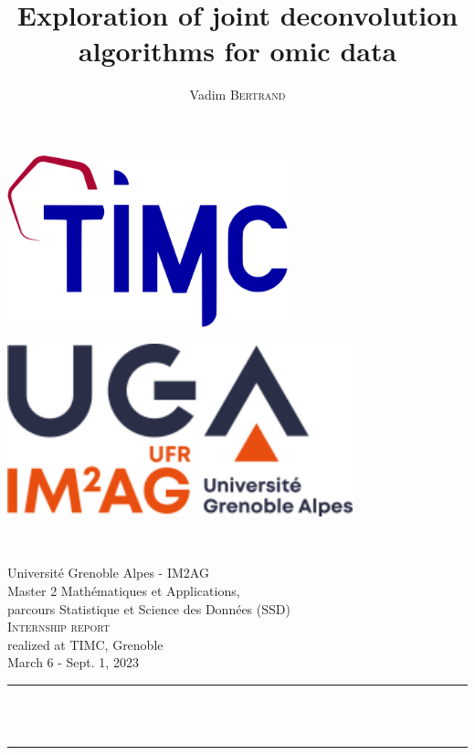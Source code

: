 \documentclass{article}
\title{Exploration of joint deconvolution algorithms for omic data}
\author{Vadim \textsc{Bertrand}}
\date{}
\makeatletter
\let\thetitle\@title
\makeatother
\begin{document}
\begin{titlepage}
    \noindent
	\begin{minipage}{0.5\textwidth}
        \includegraphics[width=0.61\textwidth,left]{logo/logo_timc}
	\end{minipage}
	\begin{minipage}{0.5\textwidth}
        \includegraphics[width=0.75\textwidth,right]{logo/logo_im2ag}
	\end{minipage}\\[1.5 cm]

    \begin{center}
        {\Large Université Grenoble Alpes - IM2AG\\[.5 cm]
        Master 2 Mathématiques et Applications,\\
        parcours Statistique et Science des Données (SSD)}\\[1.5 cm]

        \textsc{\LARGE Internship report}
        \\[.5 cm]
        \large realized at TIMC, Grenoble\\[.2 cm]
        March 6 - Sept. 1, 2023\\[1.5 cm]

	    \rule{\linewidth}{0.2 mm} \\[1 cm]
	    {\huge \bfseries \thetitle}\\[.7 cm]
	    \rule{\linewidth}{0.2 mm} \\[1.5 cm]


\end{center}
\end{titlepage}
\end{document}
